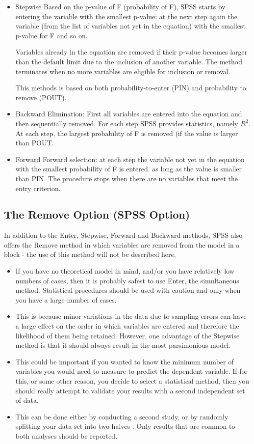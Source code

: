 \documentclass[a4paper,12pt]{article}
\begin{document}
\begin{itemize}
	\item Stepwise Based on the p-value of F (probability of F), SPSS starts by entering the variable with the smallest p-value; at the next step again the variable (from the list of variables not yet in the equation) with the smallest p-value for F and so on. 
	
	Variables already in the equation are removed if their p-value becomes larger than the default limit due to the inclusion of another variable. The method terminates when no more variables are eligible for inclusion or removal.	
	
	This methods is based on both probability-to-enter (PIN) and probability to remove (POUT).
	\item Backward Elimination: First all variables are entered into the equation and then sequentially removed. For each step SPSS provides statistics, namely $R^2$. At each step, the largest probability of F is removed (if the value is larger than POUT.
	\item Forward Forward selection: at each step the variable not yet in the equation with the smallest probability of F is entered. as long as the value is smaller than PIN. The procedure stops when there are no variables that meet the entry criterion.
\end{itemize}



\subsection{The Remove Option (SPSS Option)}
In addition to the Enter, Stepwise, Forward and Backward methods, SPSS also offers the Remove method in which variables are removed from the model in a block - the use of this method will not be described here.

\begin{itemize}
	\item If you have no theoretical model in mind, and/or you have relatively low numbers
	of cases, then it is probably safest to use Enter, the simultaneous method. Statistical
	procedures should be used with caution and only when you have a large number of
	cases. 
	\item This is because minor variations in the data due to sampling errors can have a
	large effect on the order in which variables are entered and therefore the likelihood
	of them being retained. However, one advantage of the Stepwise method is that it
	should always result in the most parsimonious model. 
	\item This could be important if
	you wanted to know the minimum number of variables you would need to measure
	to predict the dependent variable. If for this, or some other reason, you decide to
	select a statistical method, then you should really attempt to validate your results
	with a second independent set of data. 
	\item This can be done either by conducting a
	second study, or by randomly splitting your data set into two halves . Only results that are common to both analyses should be reported.
\end{itemize}
\end{document}
